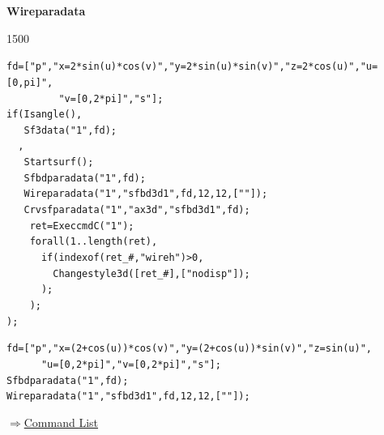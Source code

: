 \documentclass[papersize,a4paper,12pt]{article}
\newenvironment{cmd}[2]{
\hypertarget{#2}{}
\begin{center}{\bf\large #1}\end{center}
\begin{description}
}{
\end{description}
\begin{flushright} \hyperlink{functionlist}{$\Rightarrow$Command List}\end{flushright}
}
\begin{document}
\begin{cmd}{Wireparadata}{wireparadata}
\begin{center}

\end{center}

\begin{layer}{150}{0}
\end{layer}

\verb|fd=["p","x=2*sin(u)*cos(v)","y=2*sin(u)*sin(v)","z=2*cos(u)","u=[0,pi]",|\\
\verb|         "v=[0,2*pi]","s"];|\\
\verb|if(Isangle(),|\\
\verb|   Sf3data("1",fd);|\\
\verb|  ,|\\
\verb|   Startsurf();|\\
\verb|   Sfbdparadata("1",fd);|\\
\verb|   Wireparadata("1","sfbd3d1",fd,12,12,[""]);|\\
\verb|   Crvsfparadata("1","ax3d","sfbd3d1",fd);|\\
\verb|    ret=ExeccmdC("1");|\\
\verb|    forall(1..length(ret),|\\
\verb|      if(indexof(ret_#,"wireh")>0,|\\
\verb|        Changestyle3d([ret_#],["nodisp"]);|\\
\verb|      );|\\
\verb|    );|\\
\verb|);|

\vspace{\baselineskip}
\verb|fd=["p","x=(2+cos(u))*cos(v)","y=(2+cos(u))*sin(v)","z=sin(u)",|\\
\verb|      "u=[0,2*pi]","v=[0,2*pi]","s"];|\\
\verb|Sfbdparadata("1",fd);|\\
\verb|Wireparadata("1","sfbd3d1",fd,12,12,[""]); |

\begin{center}  \end{center}

\end{cmd}
\end{document}
